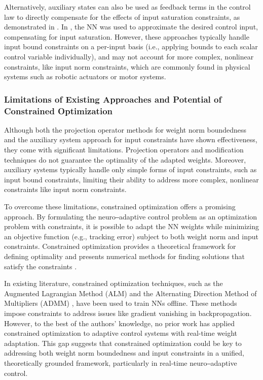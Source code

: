 \documentclass[lettersize,journal]{IEEEtran}
\begin{document}
Alternatively, auxiliary states can also be used as feedback terms in the control law to directly compensate for the effects of input saturation constraints, as demonstrated in \cite{RN34, RN38, RN37}. In \cite{RN41}, the NN was used to approximate the desired control input, compensating for input saturation. However, these approaches typically handle input bound constraints on a per-input basis (i.e., applying bounds to each scalar control variable individually), and may not account for more complex, nonlinear constraints, like input norm constraints, which are commonly found in physical systems such as robotic actuators or motor systems.

\subsubsection{Limitations of Existing Approaches and Potential of Constrained Optimization}

Although both the projection operator methods for weight norm boundedness and the auxiliary system approach for input constraints have shown effectiveness, they come with significant limitations. Projection operators and modification techniques do not guarantee the optimality of the adapted weights. Moreover, auxiliary systems typically handle only simple forms of input constraints, such as input bound constraints, limiting their ability to address more complex, nonlinear constraints like input norm constraints.

To overcome these limitations, constrained optimization offers a promising approach. By formulating the neuro‒adaptive control problem as an optimization problem with constraints, it is possible to adapt the NN weights while minimizing an objective function (e.g., tracking error) subject to both weight norm and input constraints. Constrained optimization provides a theoretical framework for defining optimality and presents numerical methods for finding solutions that satisfy the constraints \cite{RN22}.

In existing literature, constrained optimization techniques, such as the Augmented Lagrangian Method (ALM) \cite{RN60} and the Alternating Direction Method of Multipliers (ADMM) \cite{RN58, RN59}, have been used to train NNs offline. These methods impose constraints to address issues like gradient vanishing in backpropagation. However, to the best of the authors' knowledge, no prior work has applied constrained optimization to adaptive control systems with real-time weight adaptation. This gap suggests that constrained optimization could be key to addressing both weight norm boundedness and input constraints in a unified, theoretically grounded framework, particularly in real-time neuro‒adaptive control.
\end{document}
